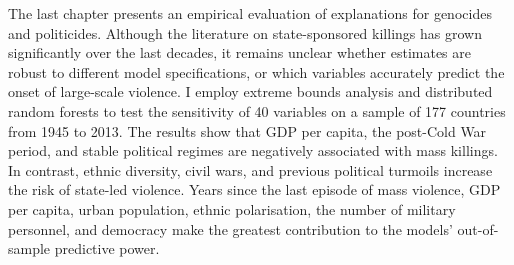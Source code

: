 The last chapter presents an empirical evaluation of explanations for genocides and politicides. Although the literature on state-sponsored killings has grown significantly over the last decades, it remains unclear whether estimates are robust to different model specifications, or which variables accurately predict the onset of large-scale violence. I employ extreme bounds analysis and distributed random forests to test the sensitivity of 40 variables on a sample of 177 countries from 1945 to 2013. The results show that GDP per capita, the post-Cold War period, and stable political regimes are negatively associated with mass killings. In contrast, ethnic diversity, civil wars, and previous political turmoils increase the risk of state-led violence. Years since the last episode of mass violence, GDP per capita, urban population, ethnic polarisation, the number of military personnel, and democracy make the greatest contribution to the models' out-of-sample predictive power.
